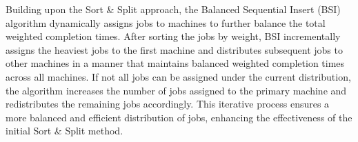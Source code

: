 Building upon the Sort \& Split approach, the Balanced Sequential Insert (BSI) algorithm dynamically assigns jobs to machines to further balance the total weighted completion times. After sorting the jobs by weight, BSI incrementally assigns the heaviest jobs to the first machine and distributes subsequent jobs to other machines in a manner that maintains balanced weighted completion times across all machines. If not all jobs can be assigned under the current distribution, the algorithm increases the number of jobs assigned to the primary machine and redistributes the remaining jobs accordingly. This iterative process ensures a more balanced and efficient distribution of jobs, enhancing the effectiveness of the initial Sort \& Split method.
